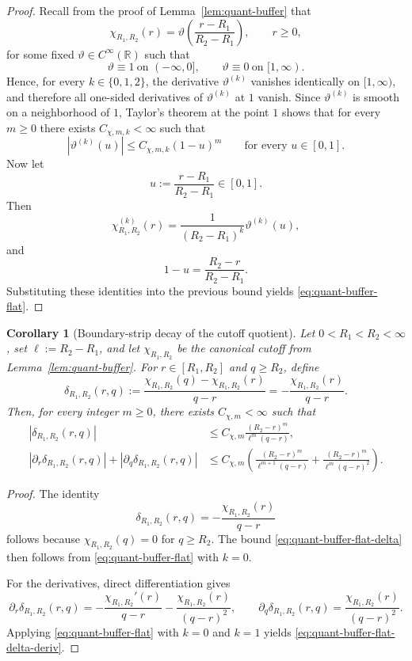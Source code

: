 \documentclass[11pt,a4paper]{amsart}
\theoremstyle{plain}
\newtheorem{corollary}[theorem]{Corollary}
\theoremstyle{definition}
\theoremstyle{remark}
\newcommand{\R}{\mathbb{R}}
\begin{document}
\begin{proof}
Recall from the proof of Lemma~\ref{lem:quant-buffer} that
\[
\chi_{R_1,R_2}(r)
=
\vartheta\!\left(\frac{r-R_1}{R_2-R_1}\right),
\qquad r\ge0,
\]
for some fixed \(\vartheta\in C^\infty(\R)\) such that
\[
\vartheta\equiv 1\ \text{on }(-\infty,0],
\qquad
\vartheta\equiv 0\ \text{on }[1,\infty).
\]
Hence, for every \(k\in\{0,1,2\}\), the derivative \(\vartheta^{(k)}\) vanishes identically on
\([1,\infty)\), and therefore all one-sided derivatives of \(\vartheta^{(k)}\) at \(1\) vanish.
Since \(\vartheta^{(k)}\) is smooth on a neighborhood of \(1\), Taylor's theorem at the point
\(1\) shows that for every \(m\ge0\) there exists \(C_{\chi,m,k}<\infty\) such that
\[
\left|
\vartheta^{(k)}(u)
\right|
\le
C_{\chi,m,k}(1-u)^m
\qquad\text{for every }u\in[0,1].
\]
Now let
\[
u:=\frac{r-R_1}{R_2-R_1}\in[0,1].
\]
Then
\[
\chi_{R_1,R_2}^{(k)}(r)
=
\frac{1}{(R_2-R_1)^k}
\vartheta^{(k)}(u),
\]
and
\[
1-u
=
\frac{R_2-r}{R_2-R_1}.
\]
Substituting these identities into the previous bound yields \eqref{eq:quant-buffer-flat}.
\end{proof}

\begin{corollary}[Boundary-strip decay of the cutoff quotient]
\label{cor:quant-buffer-flat}
Let \(0<R_1<R_2<\infty\), set \(\ell:=R_2-R_1\), and let \(\chi_{R_1,R_2}\) be the canonical
cutoff from Lemma~\ref{lem:quant-buffer}. For \(r\in[R_1,R_2]\) and \(q\ge R_2\), define
\[
\delta_{R_1,R_2}(r,q)
:=
\frac{\chi_{R_1,R_2}(q)-\chi_{R_1,R_2}(r)}{q-r}
=
-\frac{\chi_{R_1,R_2}(r)}{q-r}.
\]
Then, for every integer \(m\ge0\), there exists \(C_{\chi,m}<\infty\) such that
\begin{align}
\left|
\delta_{R_1,R_2}(r,q)
\right|
&\le
C_{\chi,m}
\frac{(R_2-r)^m}{\ell^m(q-r)},
\label{eq:quant-buffer-flat-delta}\\
\left|
\partial_r\delta_{R_1,R_2}(r,q)
\right|
+\left|
\partial_q\delta_{R_1,R_2}(r,q)
\right|
&\le
C_{\chi,m}
\left(
\frac{(R_2-r)^m}{\ell^{m+1}(q-r)}
+
\frac{(R_2-r)^m}{\ell^m(q-r)^2}
\right).
\label{eq:quant-buffer-flat-delta-deriv}
\end{align}
\end{corollary}

\begin{proof}
The identity
\[
\delta_{R_1,R_2}(r,q)
=
-\frac{\chi_{R_1,R_2}(r)}{q-r}
\]
follows because \(\chi_{R_1,R_2}(q)=0\) for \(q\ge R_2\). The bound
\eqref{eq:quant-buffer-flat-delta} then follows from \eqref{eq:quant-buffer-flat} with \(k=0\).

For the derivatives, direct differentiation gives
\[
\partial_r\delta_{R_1,R_2}(r,q)
=
-\frac{\chi_{R_1,R_2}'(r)}{q-r}
-\frac{\chi_{R_1,R_2}(r)}{(q-r)^2},
\qquad
\partial_q\delta_{R_1,R_2}(r,q)
=
\frac{\chi_{R_1,R_2}(r)}{(q-r)^2}.
\]
Applying \eqref{eq:quant-buffer-flat} with \(k=0\) and \(k=1\) yields
\eqref{eq:quant-buffer-flat-delta-deriv}.
\end{proof}
\end{document}
